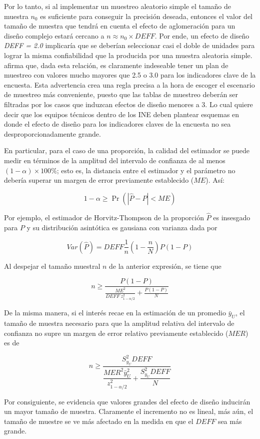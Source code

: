 \documentclass[
  12pt,
  spanish,
]{book}
\begin{document}
Por lo tanto, si al implementar un muestreo aleatorio simple el tamaño de muestra \(n_0\) es suficiente para conseguir la precisión deseada, entonces el valor del tamaño de muestra que tendrá en cuenta el efecto de aglomeración para un diseño complejo estará cercano a \(n \approx n_0 \times DEFF\). Por ende, un efecto de diseño \emph{DEFF = 2.0} implicaría que se deberían seleccionar casi el doble de unidades para lograr la misma confiabilidad que la producida por una muestra aleatoria simple. \citet{United_Nations_2008} afirma que, dada esta relación, es claramente indeseable tener un plan de muestreo con valores mucho mayores que 2.5 o 3.0 para los indicadores clave de la encuesta. Esta advertencia crea una regla precisa a la hora de escoger el escenario de muestreo más conveniente, puesto que las tablas de muestreo deberán ser filtradas por los casos que induzcan efectos de diseño menores a 3. Lo cual quiere decir que los equipos técnicos dentro de los INE deben plantear esquemas en donde el efecto de diseño para los indicadores claves de la encuesta no sea desproporcionadamente grande.

En particular, para el caso de una proporción, la calidad del estimador se puede medir en términos de la amplitud del intervalo de confianza de al menos \((1-\alpha) \times 100\%\); esto es, la distancia entre el estimador y el parámetro no debería superar un margen de error previamente establecido (\(ME\)). Así:

\[
1-\alpha \geq \Pr\left(|\hat{P}-P|<ME\right)
\]

Por ejemplo, el estimador de Horvitz-Thompson de la proporción \(\hat{P}\) es insesgado para \(P\) y su distribución asintótica es gausiana con varianza dada por

\[
Var\left(\hat{P}\right)=DEFF\frac{1}{n}(1-\frac{n}{N})P(1-P)
\]

Al despejar el tamaño muestral \(n\) de la anterior expresión, se tiene que

\[
n\geq\frac{P(1-P)}{\frac{ME^2}{DEFF \ z_{1-\alpha/2}^2}+\frac{P(1-P)}{N}}
\]

De la misma manera, si el interés recae en la estimación de un promedio \(\bar{y}_U\), el tamaño de muestra necesario para que la amplitud relativa del intervalo de confianza no supre un margen de error relativo previamente establecido (\(MER\)) es de

\[
n \geq \dfrac{S^2_{y_U}DEFF}{\dfrac{MER^2 \bar{y}_U^2}{z_{1-\alpha/2}^2}+\dfrac{S^2_{y_U}DEFF}{N}}
\]

Por consiguiente, se evidencia que valores grandes del efecto de diseño inducirán un mayor tamaño de muestra. Claramente el incremento no es lineal, más aún, el tamaño de muestre se ve más afectado en la medida en que el \(DEFF\) sea más grande.
\end{document}
